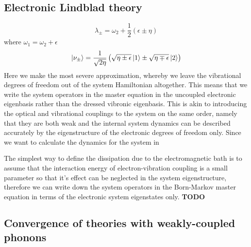 \documentclass[]{article}
\begin{document}
\subsection{Electronic Lindblad theory}
\label{ssec:electronic}
\begin{equation}
\lambda_{\pm} = \omega_2 + \frac{1}{2}(\epsilon \pm \eta)
\end{equation}
where $\omega_1 = \omega_2 +\epsilon$
\begin{equation}
\ket{\nu_\pm} = \frac{1}{\sqrt{2\eta}}\left(\sqrt{\eta\pm\epsilon}\ket{1}\pm\sqrt{\eta\mp\epsilon}\ket{2}\right)
\end{equation}
Here we make the most severe approximation, whereby we leave the vibrational degrees of freedom out of the system Hamiltonian altogether. This means that we write the system operators in the master equation in the uncoupled electronic eigenbasis rather than the dressed vibronic eigenbasis. This is akin to introducing the optical and vibrational couplings to the system on the same order, namely that they are both weak and the internal system dynamics can be described accurately by the eigenstructure of the electronic degrees of freedom only. Since we want to calculate the dynamics for the system in

The simplest way to define the dissipation due to the electromagnetic bath is to assume that the interaction energy of electron-vibration coupling is a small parameter so that it's effect can be neglected in the system eigenstructure, therefore we can write down the system operators in the Born-Markov master equation in terms of the electronic system eigenstates only.
\textbf{TODO}
\subsection{Convergence of theories with weakly-coupled phonons}
\end{document}
